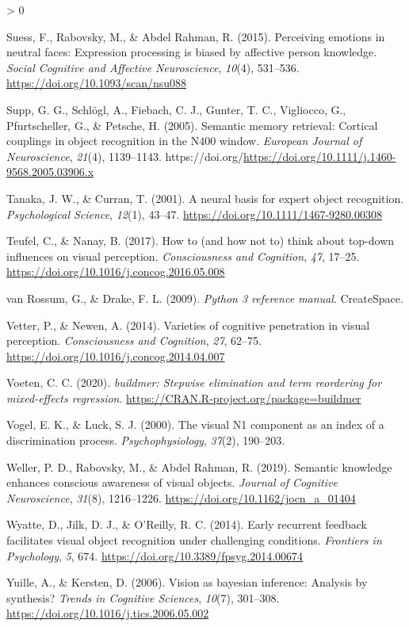 \documentclass[
  english,
  doc,12pt,twoside,floatsintext]{apa7}
\newlength{\cslhangindent}
\newenvironment{CSLReferences}[2] %
 {%
  \setlength{\parindent}{0pt}
  \ifodd #1 \everypar{\setlength{\hangindent}{\cslhangindent}}\ignorespaces\fi
  \ifnum #2 > 0
  \setlength{\parskip}{#2\baselineskip}
  \fi
 }%
 {}
\begin{document}
\begin{CSLReferences}{1}{0}
\leavevmode\hypertarget{ref-suess2015}{}%
Suess, F., Rabovsky, M., \& Abdel Rahman, R. (2015). Perceiving emotions in neutral faces: Expression processing is biased by affective person knowledge. \emph{Social Cognitive and Affective Neuroscience}, \emph{10}(4), 531--536. \url{https://doi.org/10.1093/scan/nsu088}

\leavevmode\hypertarget{ref-supp2005}{}%
Supp, G. G., Schlögl, A., Fiebach, C. J., Gunter, T. C., Vigliocco, G., Pfurtscheller, G., \& Petsche, H. (2005). Semantic memory retrieval: Cortical couplings in object recognition in the N400 window. \emph{European Journal of Neuroscience}, \emph{21}(4), 1139--1143. https://doi.org/\url{https://doi.org/10.1111/j.1460-9568.2005.03906.x}

\leavevmode\hypertarget{ref-tanaka2001}{}%
Tanaka, J. W., \& Curran, T. (2001). A neural basis for expert object recognition. \emph{Psychological Science}, \emph{12}(1), 43--47. \url{https://doi.org/10.1111/1467-9280.00308}

\leavevmode\hypertarget{ref-teufel2017}{}%
Teufel, C., \& Nanay, B. (2017). How to (and how not to) think about top-down influences on visual perception. \emph{Consciousness and Cognition}, \emph{47}, 17--25. \url{https://doi.org/10.1016/j.concog.2016.05.008}

\leavevmode\hypertarget{ref-vanrossum2009}{}%
van Rossum, G., \& Drake, F. L. (2009). \emph{Python 3 reference manual}. CreateSpace.

\leavevmode\hypertarget{ref-vetter2014}{}%
Vetter, P., \& Newen, A. (2014). Varieties of cognitive penetration in visual perception. \emph{Consciousness and Cognition}, \emph{27}, 62--75. \url{https://doi.org/10.1016/j.concog.2014.04.007}

\leavevmode\hypertarget{ref-R-buildmer}{}%
Voeten, C. C. (2020). \emph{{buildmer}: Stepwise elimination and term reordering for mixed-effects regression}. \url{https://CRAN.R-project.org/package=buildmer}

\leavevmode\hypertarget{ref-vogel2000}{}%
Vogel, E. K., \& Luck, S. J. (2000). The visual {N1} component as an index of a discrimination process. \emph{Psychophysiology}, \emph{37}(2), 190--203.

\leavevmode\hypertarget{ref-weller2019}{}%
Weller, P. D., Rabovsky, M., \& Abdel Rahman, R. (2019). Semantic knowledge enhances conscious awareness of visual objects. \emph{Journal of Cognitive Neuroscience}, \emph{31}(8), 1216--1226. \url{https://doi.org/10.1162/jocn_a_01404}

\leavevmode\hypertarget{ref-wyatte2014}{}%
Wyatte, D., Jilk, D. J., \& O'Reilly, R. C. (2014). Early recurrent feedback facilitates visual object recognition under challenging conditions. \emph{Frontiers in Psychology}, \emph{5}, 674. \url{https://doi.org/10.3389/fpsyg.2014.00674}

\leavevmode\hypertarget{ref-yuille2006}{}%
Yuille, A., \& Kersten, D. (2006). Vision as bayesian inference: Analysis by synthesis? \emph{Trends in Cognitive Sciences}, \emph{10}(7), 301--308. \url{https://doi.org/10.1016/j.tics.2006.05.002}

\end{CSLReferences}
\end{document}
